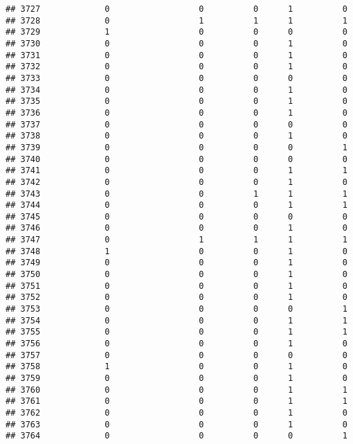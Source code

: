 \documentclass[
]{article}
\begin{document}
\begin{verbatim}
## 3727             0                  0          0      1          0
## 3728             0                  1          1      1          1
## 3729             1                  0          0      0          0
## 3730             0                  0          0      1          0
## 3731             0                  0          0      1          0
## 3732             0                  0          0      1          0
## 3733             0                  0          0      0          0
## 3734             0                  0          0      1          0
## 3735             0                  0          0      1          0
## 3736             0                  0          0      1          0
## 3737             0                  0          0      0          0
## 3738             0                  0          0      1          0
## 3739             0                  0          0      0          1
## 3740             0                  0          0      0          0
## 3741             0                  0          0      1          1
## 3742             0                  0          0      1          0
## 3743             0                  0          1      1          1
## 3744             0                  0          0      1          1
## 3745             0                  0          0      0          0
## 3746             0                  0          0      1          0
## 3747             0                  1          1      1          1
## 3748             1                  0          0      1          0
## 3749             0                  0          0      1          0
## 3750             0                  0          0      1          0
## 3751             0                  0          0      1          0
## 3752             0                  0          0      1          0
## 3753             0                  0          0      0          1
## 3754             0                  0          0      1          1
## 3755             0                  0          0      1          1
## 3756             0                  0          0      1          0
## 3757             0                  0          0      0          0
## 3758             1                  0          0      1          0
## 3759             0                  0          0      1          0
## 3760             0                  0          0      1          1
## 3761             0                  0          0      1          1
## 3762             0                  0          0      1          0
## 3763             0                  0          0      1          0
## 3764             0                  0          0      0          1

\end{verbatim}
\end{document}
